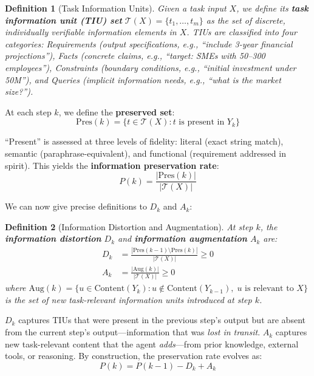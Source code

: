 \documentclass[conference]{IEEEtran}
\newtheorem{definition}{Definition}
\begin{document}
\begin{definition}[Task Information Units]
\label{def:tiu}
Given a task input $X$, we define its \textbf{task information unit (TIU) set} $\mathcal{T}(X) = \{t_1, \ldots, t_m\}$ as the set of discrete, individually verifiable information elements in $X$.
TIUs are classified into four categories:
\emph{Requirements} (output specifications, e.g., ``include 3-year financial projections''),
\emph{Facts} (concrete claims, e.g., ``target: SMEs with 50--300 employees''),
\emph{Constraints} (boundary conditions, e.g., ``initial investment under \textyen 50M''), and
\emph{Queries} (implicit information needs, e.g., ``what is the market size?'').
\end{definition}

At each step $k$, we define the \textbf{preserved set}:
\begin{equation}
    \text{Pres}(k) = \{ t \in \mathcal{T}(X) : t \text{ is present in } Y_k \}
\end{equation}

``Present'' is assessed at three levels of fidelity:
literal (exact string match), semantic (paraphrase-equivalent), and functional (requirement addressed in spirit).
This yields the \textbf{information preservation rate}:
\begin{equation}
    P(k) = \frac{|\text{Pres}(k)|}{|\mathcal{T}(X)|}
    \label{eq:preservation}
\end{equation}

We can now give precise definitions to $D_k$ and $A_k$:

\begin{definition}[Information Distortion and Augmentation]
\label{def:dk_ak}
At step $k$, the \textbf{information distortion} $D_k$ and \textbf{information augmentation} $A_k$ are:
\begin{align}
    D_k &= \frac{|\text{Pres}(k{-}1) \setminus \text{Pres}(k)|}{|\mathcal{T}(X)|} \geq 0 \label{eq:dk} \\
    A_k &= \frac{|\text{Aug}(k)|}{|\mathcal{T}(X)|} \geq 0 \label{eq:ak}
\end{align}
where $\text{Aug}(k) = \{ u \in \text{Content}(Y_k) : u \notin \text{Content}(Y_{k-1}),\; u \text{ is relevant to } X \}$ is the set of new task-relevant information units introduced at step $k$.
\end{definition}

$D_k$ captures TIUs that were present in the previous step's output but are absent from the current step's output---information that was \emph{lost in transit}.
$A_k$ captures new task-relevant content that the agent \emph{adds}---from prior knowledge, external tools, or reasoning.
By construction, the preservation rate evolves as:
\begin{equation}
    P(k) = P(k{-}1) - D_k + A_k
    \label{eq:modified_dpi}
\end{equation}
\end{document}

